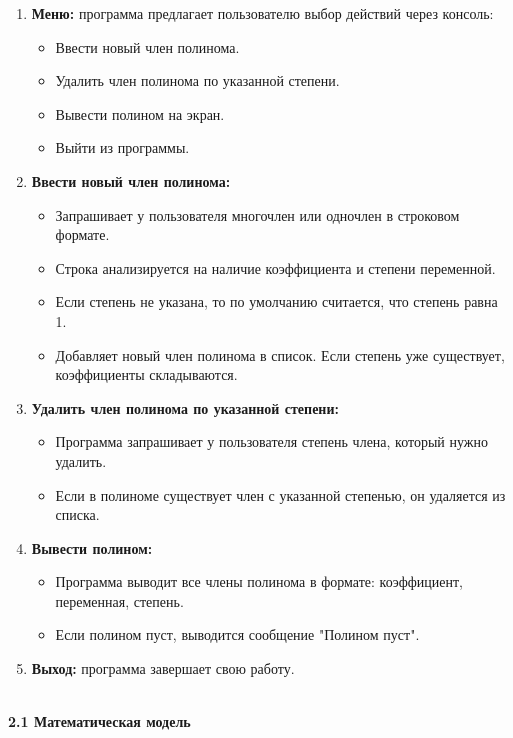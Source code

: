 \documentclass[14pt,a4paper]{article}
\begin{document}
\begin{enumerate}
\item \textbf{Меню:} программа предлагает пользователю выбор действий через консоль:
\begin{itemize}
\item Ввести новый член полинома.
\item Удалить член полинома по указанной степени.
\item Вывести полином на экран.
\item Выйти из программы.
\end{itemize}

\item \textbf{Ввести новый член полинома:}
\begin{itemize}
\item Запрашивает у пользователя многочлен или одночлен в строковом формате.
\item Строка анализируется на наличие коэффициента и степени переменной.
\item Если степень не указана, то по умолчанию считается, что степень равна 1.
\item Добавляет новый член полинома в список. Если степень уже существует, коэффициенты складываются.
\end{itemize}

\item \textbf{Удалить член полинома по указанной степени:}
\begin{itemize}
\item Программа запрашивает у пользователя степень члена, который нужно удалить.
\item Если в полиноме существует член с указанной степенью, он удаляется из списка.
\end{itemize}

\item \textbf{Вывести полином:}
\begin{itemize}
\item Программа выводит все члены полинома в формате: коэффициент, переменная, степень.
\item Если полином пуст, выводится сообщение "Полином пуст".
\end{itemize}

\item \textbf{Выход:} программа завершает свою работу.

\end{enumerate}
{\large\textbf{\\[2mm]2.1 Математическая модель}}
\end{document}
